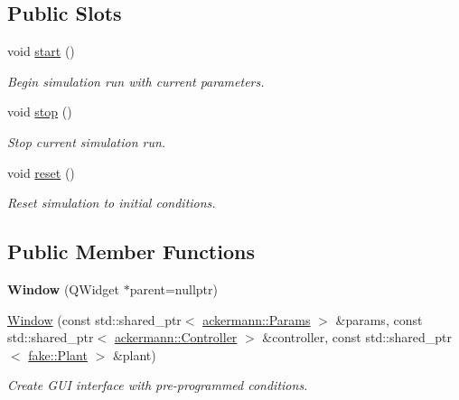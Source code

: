 \subsection*{Public Slots}
\begin{DoxyCompactItemize}
\item 
\mbox{\label{class_window_afc02c9963511f615afb1c4ae92b53376}} 
void \hyperlink{class_window_afc02c9963511f615afb1c4ae92b53376}{start} ()
\begin{DoxyCompactList}\small\item\em Begin simulation run with current parameters. \end{DoxyCompactList}\item 
\mbox{\label{class_window_a42353e5fb0b5670e6175709706670450}} 
void \hyperlink{class_window_a42353e5fb0b5670e6175709706670450}{stop} ()
\begin{DoxyCompactList}\small\item\em Stop current simulation run. \end{DoxyCompactList}\item 
\mbox{\label{class_window_a00a00d153d98b446ec8b5b5ca870081d}} 
void \hyperlink{class_window_a00a00d153d98b446ec8b5b5ca870081d}{reset} ()
\begin{DoxyCompactList}\small\item\em Reset simulation to initial conditions. \end{DoxyCompactList}\end{DoxyCompactItemize}
\subsection*{Public Member Functions}
\begin{DoxyCompactItemize}
\item 
\mbox{\label{class_window_a8c86e48ef3180201cc97cb928abd66ca}} 
{\bfseries Window} (Q\+Widget $\ast$parent=nullptr)
\item 
\hyperlink{class_window_adc0f6bc57df787f2ca22efb12ad2e6f9}{Window} (const std\+::shared\+\_\+ptr$<$ \hyperlink{structackermann_1_1_params}{ackermann\+::\+Params} $>$ \&params, const std\+::shared\+\_\+ptr$<$ \hyperlink{classackermann_1_1_controller}{ackermann\+::\+Controller} $>$ \&controller, const std\+::shared\+\_\+ptr$<$ \hyperlink{classfake_1_1_plant}{fake\+::\+Plant} $>$ \&plant)
\begin{DoxyCompactList}\small\item\em Create G\+UI interface with pre-\/programmed conditions. \end{DoxyCompactList}\end{DoxyCompactItemize}


